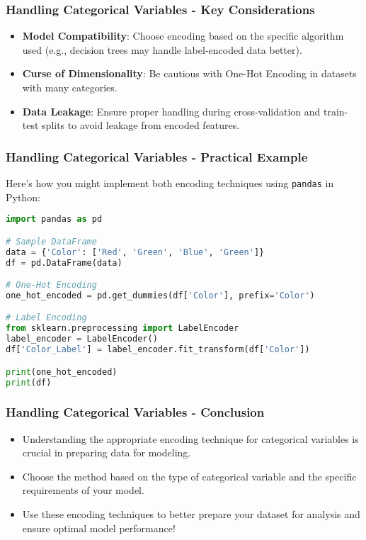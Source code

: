 \documentclass[aspectratio=169]{beamer}
\begin{document}
\begin{frame}[fragile]
    \frametitle{Handling Categorical Variables - Key Considerations}
    \begin{itemize}
        \item \textbf{Model Compatibility}: Choose encoding based on the specific algorithm used (e.g., decision trees may handle label-encoded data better).
        \item \textbf{Curse of Dimensionality}: Be cautious with One-Hot Encoding in datasets with many categories.
        \item \textbf{Data Leakage}: Ensure proper handling during cross-validation and train-test splits to avoid leakage from encoded features.
    \end{itemize}
\end{frame}

\begin{frame}[fragile]
    \frametitle{Handling Categorical Variables - Practical Example}
    Here’s how you might implement both encoding techniques using \texttt{pandas} in Python:
    \begin{lstlisting}[language=Python]
import pandas as pd

# Sample DataFrame
data = {'Color': ['Red', 'Green', 'Blue', 'Green']}
df = pd.DataFrame(data)

# One-Hot Encoding
one_hot_encoded = pd.get_dummies(df['Color'], prefix='Color')

# Label Encoding
from sklearn.preprocessing import LabelEncoder
label_encoder = LabelEncoder()
df['Color_Label'] = label_encoder.fit_transform(df['Color'])

print(one_hot_encoded)
print(df)
    \end{lstlisting}
\end{frame}

\begin{frame}[fragile]
    \frametitle{Handling Categorical Variables - Conclusion}
    \begin{itemize}
        \item Understanding the appropriate encoding technique for categorical variables is crucial in preparing data for modeling.
        \item Choose the method based on the type of categorical variable and the specific requirements of your model.
        \item Use these encoding techniques to better prepare your dataset for analysis and ensure optimal model performance!
    \end{itemize}
\end{frame}
\end{document}
